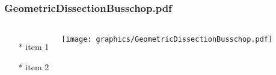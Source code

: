 \begin{frame} \frametitle{GeometricDissectionBusschop.pdf}
    \begin{columns}[c]
        \begin{itemize}
            \item[*] item 1
            \item[*] item 2
        \end{itemize}
        \begin{minipage}{\linewidth}
            \begin{center}
            \texttt{[image: graphics/GeometricDissectionBusschop.pdf]}
            \label{gfx:GeometricDissectionBusschop.pdf}
            \end{center}
        \end{minipage}
    \end{columns}
\end{frame}
